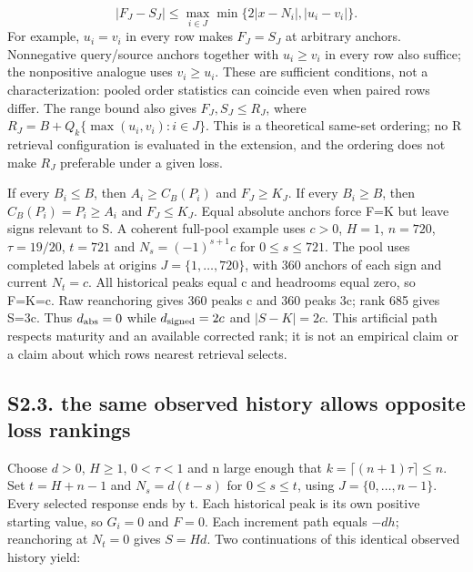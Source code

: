 \documentclass[11pt,a4paper]{article}
\begin{document}
\[
|F_J-S_J|\le\max_{i\in J}\min\{2|x-N_i|,|u_i-v_i|\}.
\]
For example, \(u_i=v_i\) in every row makes \(F_J=S_J\) at arbitrary anchors. Nonnegative query/source anchors together with \(u_i\ge v_i\) in every row also suffice; the nonpositive analogue uses \(v_i\ge u_i\). These are sufficient conditions, not a characterization: pooled order statistics can coincide even when paired rows differ. The range bound also gives \(F_J,S_J\le R_J\), where \(R_J=B+Q_k\{\max(u_i,v_i):i\in J\}\). This is a theoretical same-set ordering; no R retrieval configuration is evaluated in the extension, and the ordering does not make \(R_J\) preferable under a given loss.

If every \(B_i\le B\), then \(A_i\ge C_B(P_i)\) and \(F_J\ge K_J\). If every \(B_i\ge B\), then \(C_B(P_i)=P_i\ge A_i\) and \(F_J\le K_J\). Equal absolute anchors force F=K but leave signs relevant to S. A coherent full-pool example uses \(c>0\), \(H=1\), \(n=720\), \(\tau=19/20\), \(t=721\) and \(N_s=(-1)^{s+1}c\) for \(0\le s\le721\). The pool uses completed labels at origins \(J=\{1,\ldots,720\}\), with 360 anchors of each sign and current \(N_t=c\). All historical peaks equal c and headrooms equal zero, so F=K=c. Raw reanchoring gives 360 peaks c and 360 peaks 3c; rank 685 gives S=3c. Thus \(d_{\rm abs}=0\) while \(d_{\rm signed}=2c\) and \(|S-K|=2c\). This artificial path respects maturity and an available corrected rank; it is not an empirical claim or a claim about which rows nearest retrieval selects.

\subsection*{S2.3. the same observed history allows opposite loss rankings}
Choose \(d>0\), \(H\ge 1\), \(0<\tau<1\) and n large enough that \(k=\lceil(n+1)\tau\rceil\le n\). Set \(t=H+n-1\) and \(N_s=d(t-s)\) for \(0\le s\le t\), using \(J=\{0,\ldots,n-1\}\). Every selected response ends by t. Each historical peak is its own positive starting value, so \(G_i=0\) and \(F=0\). Each increment path equals \(-dh\); reanchoring at \(N_t=0\) gives \(S=Hd\). Two continuations of this identical observed history yield:
\end{document}
